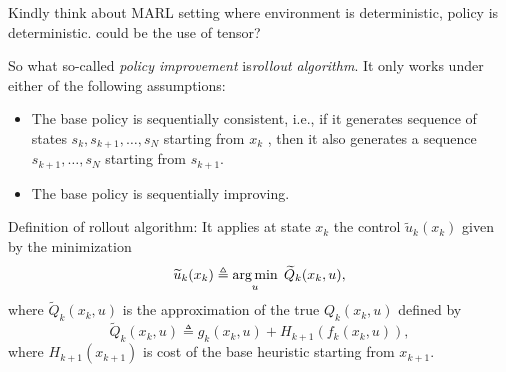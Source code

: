 \documentclass[11pt,a4paper]{article}
\begin{document}
{\blue Kindly think about MARL setting where environment is deterministic, policy is deterministic. could be the use of tensor?}

So what so-called \textit{policy improvement} is\textit{rollout algorithm}. It only works under either of the following assumptions:
\begin{itemize}
    \item The base policy is sequentially consistent, i.e., if it generates sequence of states $s_k, s_{k+1}, \ldots , s_N$ starting from $x_{k}$ , then it also generates a sequence $s_{k+1}, \ldots , s_{N}$ starting from $s_{k+1}$.
    \item The base policy is sequentially improving.
\end{itemize}

Definition of rollout algorithm:
It applies at state $x_k$ the control $\widetilde{u}_k(x_k)$ given by the minimization
\[
\widetilde{u}_k(x_k) \triangleq \operatorname*{arg\,min}_{u} \; \widetilde{Q}_k(x_k, u),
\] 
where $\widetilde{Q}_k(x_k, u)$ is the approximation of the true $Q_k(x_k, u)$ defined by
\[
\widetilde{Q}_k(x_k, u) \triangleq g_k(x_k, u) + H_{k+1}(f_k(x_k, u)),
\] 
where $H_{k+1}(x_{k+1})$ is cost of the base heuristic starting from $x_{k+1}$.
\end{document}
